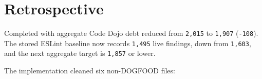 \begin{itemize}
\end{itemize}

\section{Retrospective}\label{record-219-retrospective}

Completed with aggregate Code Dojo debt reduced from \texttt{2\allowbreak{},\allowbreak{}0\allowbreak{}1\allowbreak{}5} to \texttt{1\allowbreak{},\allowbreak{}9\allowbreak{}0\allowbreak{}7} (\texttt{-\allowbreak{}1\allowbreak{}0\allowbreak{}8}). The stored ESLint baseline now records \texttt{1\allowbreak{},\allowbreak{}4\allowbreak{}9\allowbreak{}5} live findings, down from \texttt{1\allowbreak{},\allowbreak{}6\allowbreak{}0\allowbreak{}3}, and the next aggregate target is \texttt{1\allowbreak{},\allowbreak{}8\allowbreak{}5\allowbreak{}7} or lower.

The implementation cleaned six non-DOGFOOD files:

